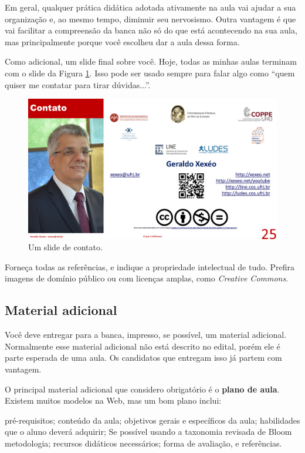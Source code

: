 \documentclass{article}
\def\tam{0.6}
\begin{document}
Em geral, qualquer prática didática adotada ativamente na aula vai ajudar a sua organização e, ao mesmo tempo, diminuir seu nervosismo. Outra vantagem é que vai facilitar a compreensão da banca não só do que está acontecendo na sua aula, mas principalmente porque você escolheu dar a aula dessa forma.

Como adicional, um slide final sobre você. Hoje, todas as minhas aulas terminam com o slide da Figura \ref{fig:fim}. Isso pode ser usado sempre para falar algo como ``quem quiser me contatar para tirar dúvidas...''.

\begin{figure}[h]
    \centering
    \includegraphics[width=\tam\linewidth]{imagens/fim.png}
    \caption{Um slide de contato.}
    \label{fig:fim}
\end{figure}

Forneça todas as referências, e indique a propriedade intelectual de tudo. Prefira imagens de domínio público ou com licenças amplas, como \textit{Creative Commons}.

\subsection{Material adicional}

Você deve entregar para a banca, impresso, se possível, um material adicional. Normalmente esse material adicional não está descrito no edital, porém ele é parte esperada de uma aula. Os candidatos que entregam isso já partem com vantagem.

O principal material adicional que considero obrigatório é o \textbf{plano de aula}. Existem muitos modelos na Web, mas um bom plano inclui:
\begin{outline}
\1 pré-requisitos;
\1 conteúdo da aula;
\1 objetivos gerais e específicos da aula;
\1 habilidades que o aluno deverá adquirir;
\2 Se possível usando a taxonomia revisada de Bloom
\1 metodologia;
\1 recursos didáticos necessários;
\1 forma de avaliação, e
\1 referências.
\end{outline}
\end{document}
